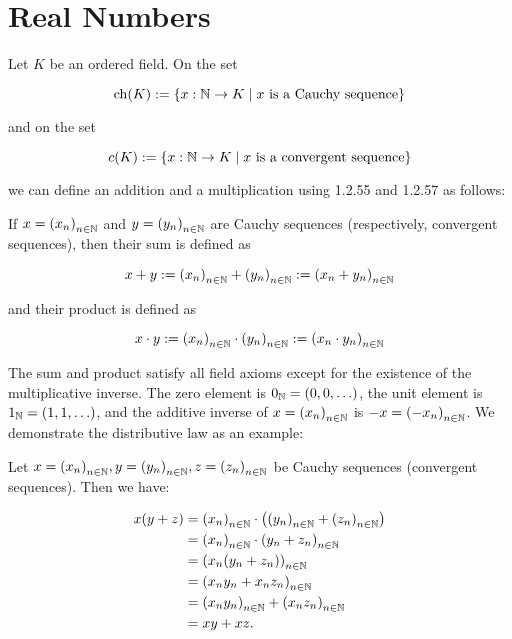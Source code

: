 \newpage
\section{Real Numbers}

Let \( K \) be an ordered field. On the set
		
\[
	\operatorname{ch}(K) := \{ x : \mathbb{N} \to K \mid x \text{ is a Cauchy sequence} \}
\]
		
and on the set
	
\[
	c(K) := \{ x : \mathbb{N} \to K \mid x \text{ is a convergent sequence} \}
\]

we can define an addition and a multiplication using 1.2.55 and 1.2.57 as follows:

If \( x = {(x_n)}_{n \in \mathbb{N}} \) and \( y = {(y_n)}_{n \in \mathbb{N}} \) are Cauchy sequences 
(respectively, convergent sequences), then their sum is defined as
	
\[
	x + y := {(x_n)}_{n \in \mathbb{N}} + {(y_n)}_{n \in \mathbb{N}} := {(x_n + y_n)}_{n \in \mathbb{N}}
\]
	
and their product is defined as

\[
	x \cdot y := {(x_n)}_{n \in \mathbb{N}} \cdot {(y_n)}_{n \in \mathbb{N}} := {(x_n \cdot y_n)}_{n \in 
	\mathbb{N}}
\]

The sum and product satisfy all field axioms except for the existence of the multiplicative inverse.
The zero element is \( 0_{\mathbb{N}} = (0, 0, \ldots) \), the unit element is \( 1_{\mathbb{N}} = (1, 1, 
\ldots) \), and the additive inverse of \( x = {(x_n)}_{n \in \mathbb{N}} \) is 
\( -x = {(-x_n)}_{n \in \mathbb{N}} \). We demonstrate the distributive law as an example:

Let \( x = {(x_n)}_{n \in \mathbb{N}}, y = {(y_n)}_{n \in \mathbb{N}}, z = {(z_n)}_{n \in \mathbb{N}} \) be 
Cauchy sequences (convergent sequences). Then we have:

\begin{align*}
	x(y + z) &= {(x_n)}_{n \in \mathbb{N}} \cdot \left( {(y_n)}_{n \in \mathbb{N}} + {(z_n)}_{n \in \mathbb{N}} \right)\\
	&= {(x_n)}_{n \in \mathbb{N}} \cdot {(y_n + z_n)}_{n \in \mathbb{N}}\\ 
	&= {(x_n (y_n + z_n))}_{n \in \mathbb{N}}\\
	&= {(x_n y_n + x_n z_n)}_{n \in \mathbb{N}}\\
	&= {(x_n y_n)}_{n \in \mathbb{N}} + {(x_n z_n)}_{n \in \mathbb{N}}\\
	&= xy + xz.
\end{align*}

